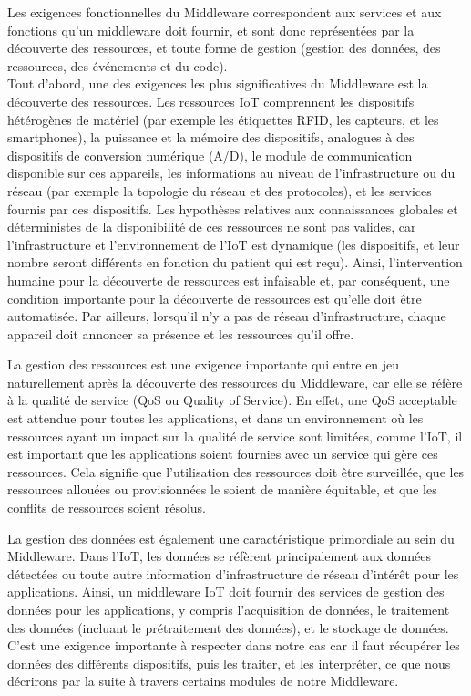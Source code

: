 Les exigences fonctionnelles du Middleware correspondent aux services et aux fonctions qu’un middleware doit fournir, et sont donc représentées par la découverte des ressources, et toute forme de gestion (gestion des données, des ressources, des événements et du code).
\\

Tout d'abord, une des exigences les plus significatives du Middleware est la découverte des ressources. Les ressources IoT comprennent les dispositifs hétérogènes de matériel (par exemple les étiquettes RFID, les capteurs, et les smartphones), la puissance et la mémoire des dispositifs, analogues à des dispositifs de conversion numérique (A/D), le module de communication disponible sur ces appareils, les informations au niveau de l'infrastructure ou du réseau (par exemple la topologie du réseau et des protocoles), et les services fournis par ces dispositifs. Les hypothèses relatives aux connaissances globales et déterministes de la disponibilité de ces ressources ne sont pas valides, car l'infrastructure et l'environnement de l'IoT est dynamique (les dispositifs, et leur nombre seront différents en fonction du patient qui est reçu). Ainsi, l'intervention humaine pour la découverte de ressources est infaisable et, par conséquent, une condition importante pour la découverte de ressources est qu'elle doit être automatisée. Par ailleurs, lorsqu'il n'y a pas de réseau d'infrastructure, chaque appareil doit annoncer sa présence et les ressources qu'il offre.

La gestion des ressources est une exigence importante qui entre en jeu naturellement après la découverte des ressources du Middleware, car elle se réfère à la qualité de service (QoS ou Quality of Service). En effet, une QoS acceptable est attendue pour toutes les applications, et dans un environnement où les ressources ayant un impact sur la qualité de service sont limitées, comme l'IoT, il est important que les applications soient fournies avec un service qui gère ces ressources. Cela signifie que l'utilisation des ressources doit être surveillée, que les ressources allouées ou provisionnées le soient de manière équitable, et que les conflits de ressources soient résolus.

La gestion des données est également une caractéristique primordiale au sein du Middleware. Dans l'IoT, les données se réfèrent principalement aux données détectées ou toute autre information d'infrastructure de réseau d'intérêt pour les applications. Ainsi, un middleware IoT doit fournir des services de gestion des données pour les applications, y compris l'acquisition de données, le traitement des données (incluant le prétraitement des données), et le stockage de données. C'est une exigence importante à respecter dans notre cas car il faut récupérer les données des différents dispositifs, puis les traiter, et les interpréter, ce que nous décrirons par la suite à travers certains modules de notre Middleware.

